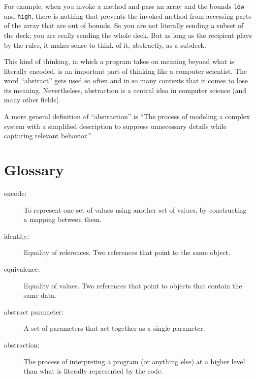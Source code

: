 \documentclass[12pt]{book}
\theoremstyle{definition}
\begin{document}
For example, when you invoke a method and pass an array and the bounds
{\tt low} and {\tt high}, there is nothing that prevents the invoked
method from accessing parts of the array that are out of bounds.  So
you are not literally sending a subset of the deck; you are really
sending the whole deck.  But as long as the recipient plays by the
rules, it makes sense to think of it, abstractly, as a subdeck.

This kind of thinking, in which a program takes on meaning beyond what
is literally encoded, is an important part of thinking like a computer
scientist.  The word ``abstract'' gets used so often and in so many
contexts that it comes to lose its meaning.  Nevertheless, abstraction
is a central idea in computer science (and many other fields).

A more general definition of ``abstraction'' is ``The process of
modeling a complex system with a simplified description to
suppress unnecessary details while capturing relevant behavior.''


\section{Glossary}

\begin{description}

\item[encode:]  To represent one set of values using another
set of values, by constructing a mapping between them.

\item[identity:]  Equality of references.  Two
references that point to the same object.

\item[equivalence:]  Equality of values.  Two references
that point to objects that contain the same data.

\item[abstract parameter:]  A set of parameters that act together
as a single parameter.

\item[abstraction:]  The process of interpreting a program
(or anything else) at a higher level than what is literally
represented by the code.


\end{description}
\end{document}
